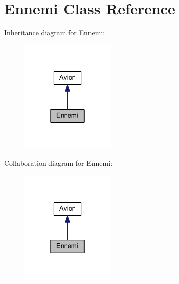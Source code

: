 \hypertarget{classEnnemi}{\section{Ennemi Class Reference}
\label{classEnnemi}
}


Inheritance diagram for Ennemi\+:
\nopagebreak
\begin{figure}[H]
\begin{center}
\leavevmode
\includegraphics[width=130pt]{classEnnemi__inherit__graph}
\end{center}
\end{figure}


Collaboration diagram for Ennemi\+:
\nopagebreak
\begin{figure}[H]
\begin{center}
\leavevmode
\includegraphics[width=130pt]{classEnnemi__coll__graph}
\end{center}
\end{figure}
